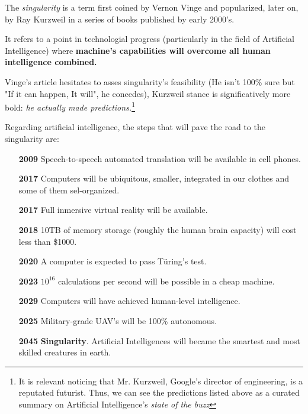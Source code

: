 The \textit{singularity} is a term first coined by Vernon Vinge and popularized, 
later on, by Ray Kurzweil in a series of books published by early 2000's.
\cite{age, singularity} 

It refers to a point in technologial progress (particularly in the field of 
Artificial Intelligence) where \textbf{machine's capabilities will overcome all human 
intelligence combined.}

Vinge's article hesitates to asses singularity's feasibility (He isn't 100\% sure 
but "If it can happen, It will", he concedes), Kurzweil stance is significatively 
more bold: \textit{he actually made predictions.}\footnote{
	It is relevant noticing that Mr. Kurzweil, Google's director of engineering, 
	is a reputated futurist. Thus, we can see the predictions listed above as a 
	curated summary on Artificial Intelligence's \textit{state of the buzz}
}

Regarding artificial intelligence, the steps that will pave the road to the 
singularity are\cite{interview}: 

\begin{itemize}
	\item [\textbf{\textcolor{secondary}{2009}}] Speech-to-speech automated 
		translation will be available in cell phones.

	\item [\textbf{\textcolor{secondary}{2017}}] Computers will be ubiquitous, 
		smaller, integrated in our clothes and some of them sel-organized.

	\item [\textbf{\textcolor{secondary}{2017}}] Full inmersive virtual reality 
		will be available.
	
	\item [\textbf{\textcolor{secondary}{2018}}] 10TB of memory storage (roughly 
		the human brain capacity) will cost less than \$1000.

	\item [\textbf{\textcolor{secondary}{2020}}] A computer is expected to pass 
		Türing's test. 

	\item [\textbf{\textcolor{secondary}{2023}}] $10^{16}$ calculations per second 
		will be possible in a cheap machine.

	\item [\textbf{\textcolor{secondary}{2029}}] Computers will have achieved 
		human-level intelligence.

	\item [\textbf{\textcolor{secondary}{2025}}] Military-grade UAV's will be 
		100\% autonomous.

	\item [\textbf{\textcolor{secondary}{2045}}] \textbf{Singularity}. Artificial 
		Intelligences will became the smartest and most skilled creatures in earth.

\end{itemize}


